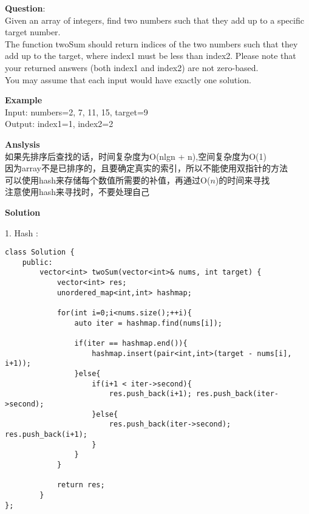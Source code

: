     
\begin{description}
    \item{\textbf{Question}}:\\%
		Given an array of integers, find two numbers such that they add up to a specific target number.\\
		The function twoSum should return indices of the two numbers such that they add up to the target, where index1 must be less than index2. Please note that your returned answers (both index1 and index2) are not zero-based.\\
		You may assume that each input would have exactly one solution.

    \item{\textbf{Example}}\\
		Input: numbers={2, 7, 11, 15}, target=9\\
		Output: index1=1, index2=2

    \item{\textbf{Anslysis}}\\
		如果先排序后查找的话，时间复杂度为O(nlgn + n),空间复杂度为O(1)\\
		因为array不是已排序的，且要确定真实的索引，所以不能使用双指针的方法\\
		可以使用hash来存储每个数值所需要的补值，再通过O($n$)的时间来寻找\\
		注意使用hash来寻找时，不要处理自己

    \item{\textbf{Solution}}
	\item{1. Hash} : 
		\\
		\begin{lstlisting}
class Solution {
	public:
		vector<int> twoSum(vector<int>& nums, int target) {
			vector<int> res;
			unordered_map<int,int> hashmap;

			for(int i=0;i<nums.size();++i){
				auto iter = hashmap.find(nums[i]);

				if(iter == hashmap.end()){
					hashmap.insert(pair<int,int>(target - nums[i], i+1));
				}else{
					if(i+1 < iter->second){
						res.push_back(i+1);	res.push_back(iter->second);
					}else{
						res.push_back(iter->second);	res.push_back(i+1);
					}
				}
			}

			return res;
		}
};
		\end{lstlisting}

\end{description}

